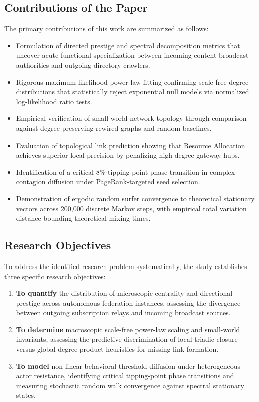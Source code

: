 \documentclass[conference]{IEEEtran}
\begin{document}
\subsection{Contributions of the Paper}
The primary contributions of this work are summarized as follows:
\begin{itemize}
    \item Formulation of directed prestige and spectral decomposition metrics that uncover acute functional specialization between incoming content broadcast authorities and outgoing directory crawlers.
    \item Rigorous maximum-likelihood power-law fitting confirming scale-free degree distributions that statistically reject exponential null models via normalized log-likelihood ratio tests.
    \item Empirical verification of small-world network topology through comparison against degree-preserving rewired graphs and random baselines.
    \item Evaluation of topological link prediction showing that Resource Allocation achieves superior local precision by penalizing high-degree gateway hubs.
    \item Identification of a critical 8\% tipping-point phase transition in complex contagion diffusion under PageRank-targeted seed selection.
    \item Demonstration of ergodic random surfer convergence to theoretical stationary vectors across 200,000 discrete Markov steps, with empirical total variation distance bounding theoretical mixing times.
\end{itemize}

\subsection{Research Objectives}
To address the identified research problem systematically, the study establishes three specific research objectives:
\begin{enumerate}
    \item[\textbf{RO1:}] \textbf{To quantify} the distribution of microscopic centrality and directional prestige across autonomous federation instances, assessing the divergence between outgoing subscription relays and incoming broadcast sources.
    \item[\textbf{RO2:}] \textbf{To determine} macroscopic scale-free power-law scaling and small-world invariants, assessing the predictive discrimination of local triadic closure versus global degree-product heuristics for missing link formation.
    \item[\textbf{RO3:}] \textbf{To model} non-linear behavioral threshold diffusion under heterogeneous actor resistance, identifying critical tipping-point phase transitions and measuring stochastic random walk convergence against spectral stationary states.
\end{enumerate}
\end{document}

